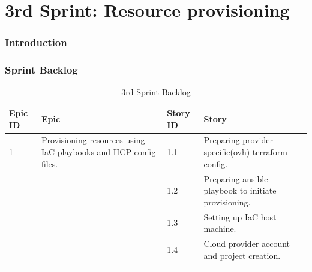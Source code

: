 \graphicspath{{./assets/}}
\setcounter{mtc}{5}
\chapter{3rd Sprint: Resource provisioning  }

\minitoc
\newpage
\subsection*{Introduction}
\subsection{Sprint Backlog}

\begin{longtable}[H]{|m{1.5cm}|m{3cm}|m{1.5cm}|m{8cm}|}
\hline
{\textbf{Epic ID}} & {\textbf{Epic}} & {\textbf{Story ID}} & {\textbf{Story}}\\
\hline
1  & \raggedright Provisioning resources using IaC playbooks and HCP config files.  &  1.1	 & Preparing provider specific(ovh) terraform config. \\
\cline{3-4}
& & 1.2 & Preparing ansible playbook to initiate provisioning. \\
\cline{3-4}
& & 1.3	& Setting up IaC host machine.  \\
\cline{3-4}
& & 1.4	& Cloud provider account and project creation.  \\
\hline
\caption{3rd Sprint Backlog}
\end{longtable}

